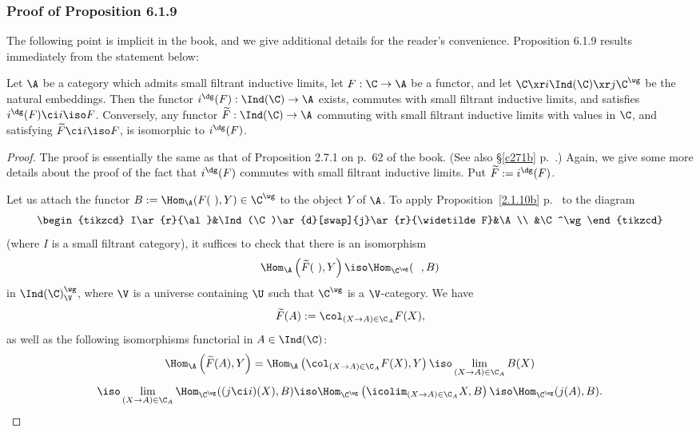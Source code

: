 \documentclass[12pt]{article}
\theoremstyle{remark}
\theoremstyle{definition}
\begin{document}


\subsubsection{Proof of Proposition 6.1.9}

The following point is implicit in the book, and we give additional details for the reader's convenience. Proposition 6.1.9 results immediately from the statement below:

\begin{prop} 
Let $\A$ be a category which admits small filtrant inductive limits, let $F:\C\to\A$ be a functor, and let $\C\xr i\Ind(\C)\xr j\C^\wg$ be the natural embeddings. Then the functor $i^\dg(F):\Ind(\C)\to\A$ exists, commutes with small filtrant inductive limits, and satisfies $i^\dg(F)\ci i\iso F$. Conversely, any functor $\widetilde F:\Ind(\C)\to\A$ commuting with small filtrant inductive limits with values in $\C$, and satisfying $\widetilde F\ci i\iso F$, is isomorphic to $i^\dg(F)$. 
\end{prop} 

\begin{proof}
The proof is essentially the same as that of Proposition 2.7.1 on p.~62 of the book. (See also \S\ref{c271b} p.~.) Again, we give some more details about the proof of the fact that $i^\dg(F)$ commutes with small filtrant inductive limits. Put $\widetilde F:=i^\dg(F)$. 

Let us attach the functor $B:=\Hom_\A(F(\ ),Y)\in\C^\wg$ to the object $Y$ of $\A$. To apply Proposition~\ref{2.1.10b} p.~ to the diagram 
$$
\begin{tikzcd}
I\ar{r}{\al}&\Ind(\C)\ar{d}[swap]{j}\ar{r}{\widetilde F}&\A\\
&\C^\wg
\end{tikzcd}
$$
(where $I$ is a small filtrant category), it suffices to check that there is an isomorphism 
$$
\Hom_\A\left(\widetilde F(\ ),Y\right)\iso
\Hom_{\C^\wg}(\ \ ,B)
$$ 
in $\Ind(\C)^\wg_\V$, where $\V$ is a universe containing $\U$ such that $\C^\wg$ is a $\V$-category. We have 
$$
\widetilde F(A):=\col_{(X\to A)\in\C_A}F(X),
$$ 
as well as the following isomorphisms functorial in $A\in\Ind(\C)$:
$$
\Hom_\A\left(\widetilde F(A),Y\right)=
\Hom_\A\left(\col_{(X\to A)\in\C_A}F(X),Y\right)\iso
\lim_{(X\to A)\in\C_A}B(X)
$$
$$
\iso
\lim_{(X\to A)\in\C_A}\Hom_{\C^\wg}((j\ci i)(X),B)
\iso
\Hom_{\C^\wg}\left(\icolim_{(X\to A)\in\C_A}X,B\right)\iso
\Hom_{\C^\wg}(j(A),B).
$$
\end{proof}
\end{document}

